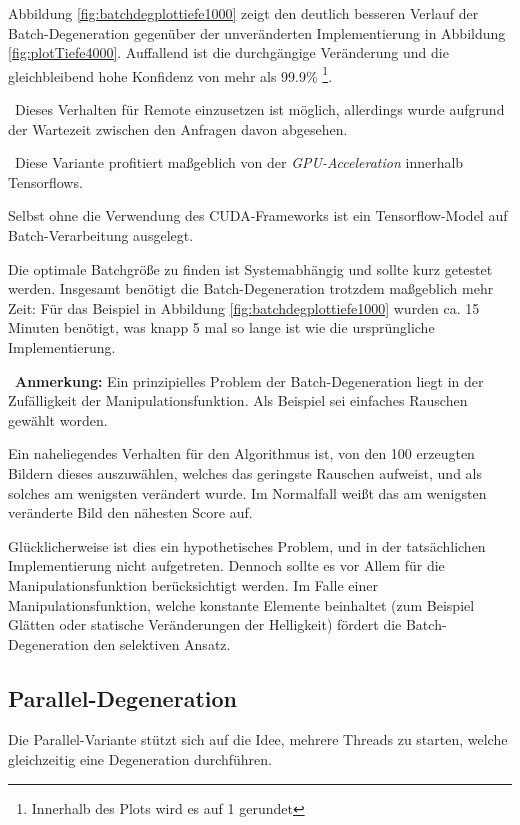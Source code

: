 Abbildung \ref{fig:batchdegplottiefe1000} zeigt den deutlich besseren Verlauf der Batch-Degeneration gegenüber der unveränderten Implementierung in Abbildung \ref{fig:plotTiefe4000}. Auffallend ist die durchgängige Veränderung und die gleichbleibend hohe Konfidenz von mehr als 99.9\% \footnote{Innerhalb des Plots wird es auf 1 gerundet}. 

~\newline Dieses Verhalten für Remote einzusetzen ist möglich, allerdings wurde aufgrund der Wartezeit zwischen den Anfragen davon abgesehen. 

~\newline Diese Variante profitiert maßgeblich von der \textit{GPU-Acceleration} innerhalb Tensorflows. 

Selbst ohne die Verwendung des CUDA-Frameworks ist ein Tensorflow-Model auf Batch-Verarbeitung ausgelegt. 

Die optimale Batchgröße zu finden ist Systemabhängig und sollte kurz getestet werden. Insgesamt benötigt die Batch-Degeneration trotzdem maßgeblich mehr Zeit: Für das Beispiel in Abbildung \ref{fig:batchdegplottiefe1000} wurden ca. 15 Minuten benötigt, was knapp 5 mal so lange ist wie die ursprüngliche Implementierung. 

~\newline \textbf{Anmerkung:} Ein prinzipielles Problem der Batch-Degeneration liegt in der Zufälligkeit der Manipulationsfunktion. Als Beispiel sei einfaches Rauschen gewählt worden. 

Ein naheliegendes Verhalten für den Algorithmus ist, von den 100 erzeugten Bildern dieses auszuwählen, welches das geringste Rauschen aufweist, und als solches am wenigsten verändert wurde. Im Normalfall weißt das am wenigsten veränderte Bild den nähesten Score auf. 

Glücklicherweise ist dies ein hypothetisches Problem, und in der tatsächlichen Implementierung nicht aufgetreten. Dennoch sollte es vor Allem für die Manipulationsfunktion berücksichtigt werden. Im Falle einer Manipulationsfunktion, welche konstante Elemente beinhaltet (zum Beispiel Glätten oder statische Veränderungen der Helligkeit) fördert die Batch-Degeneration den selektiven Ansatz.
\subsection{Parallel-Degeneration}
Die Parallel-Variante stützt sich auf die Idee, mehrere Threads zu starten, welche gleichzeitig eine Degeneration durchführen.

